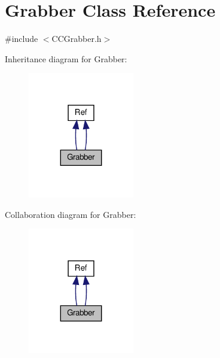 \hypertarget{classGrabber}{}\section{Grabber Class Reference}
\label{classGrabber}


{\ttfamily \#include $<$C\+C\+Grabber.\+h$>$}



Inheritance diagram for Grabber\+:
\nopagebreak
\begin{figure}[H]
\begin{center}
\leavevmode
\includegraphics[width=131pt]{classGrabber__inherit__graph}
\end{center}
\end{figure}


Collaboration diagram for Grabber\+:
\nopagebreak
\begin{figure}[H]
\begin{center}
\leavevmode
\includegraphics[width=131pt]{classGrabber__coll__graph}
\end{center}
\end{figure}
